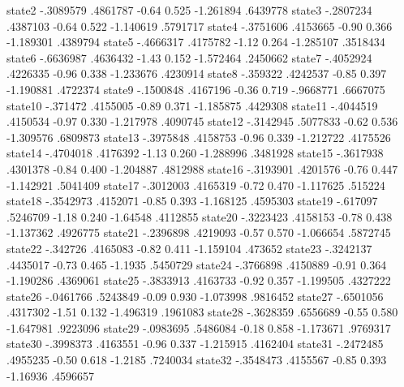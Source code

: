       state2 {\VBAR}  -.3089579   .4861787    -0.64   0.525    -1.261894    .6439778
      state3 {\VBAR}  -.2807234   .4387103    -0.64   0.522    -1.140619    .5791717
      state4 {\VBAR}  -.3751606   .4153665    -0.90   0.366    -1.189301    .4389794
      state5 {\VBAR}  -.4666317   .4175782    -1.12   0.264    -1.285107    .3518434
      state6 {\VBAR}  -.6636987   .4636432    -1.43   0.152    -1.572464    .2450662
      state7 {\VBAR}  -.4052924   .4226335    -0.96   0.338    -1.233676    .4230914
      state8 {\VBAR}   -.359322   .4242537    -0.85   0.397    -1.190881    .4722374
      state9 {\VBAR}  -.1500848   .4167196    -0.36   0.719    -.9668771    .6667075
     state10 {\VBAR}   -.371472   .4155005    -0.89   0.371    -1.185875    .4429308
     state11 {\VBAR}  -.4044519   .4150534    -0.97   0.330    -1.217978    .4090745
     state12 {\VBAR}  -.3142945   .5077833    -0.62   0.536    -1.309576    .6809873
     state13 {\VBAR}  -.3975848   .4158753    -0.96   0.339    -1.212722    .4175526
     state14 {\VBAR}  -.4704018   .4176392    -1.13   0.260    -1.288996    .3481928
     state15 {\VBAR}  -.3617938   .4301378    -0.84   0.400    -1.204887    .4812988
     state16 {\VBAR}  -.3193901   .4201576    -0.76   0.447    -1.142921    .5041409
     state17 {\VBAR}  -.3012003   .4165319    -0.72   0.470    -1.117625     .515224
     state18 {\VBAR}  -.3542973   .4152071    -0.85   0.393    -1.168125    .4595303
     state19 {\VBAR}   -.617097   .5246709    -1.18   0.240     -1.64548    .4112855
     state20 {\VBAR}  -.3223423   .4158153    -0.78   0.438    -1.137362    .4926775
     state21 {\VBAR}  -.2396898   .4219093    -0.57   0.570    -1.066654    .5872745
     state22 {\VBAR}   -.342726   .4165083    -0.82   0.411    -1.159104     .473652
     state23 {\VBAR}  -.3242137   .4435017    -0.73   0.465      -1.1935    .5450729
     state24 {\VBAR}  -.3766898   .4150889    -0.91   0.364    -1.190286    .4369061
     state25 {\VBAR}  -.3833913   .4163733    -0.92   0.357    -1.199505    .4327222
     state26 {\VBAR}  -.0461766   .5243849    -0.09   0.930    -1.073998    .9816452
     state27 {\VBAR}  -.6501056   .4317302    -1.51   0.132    -1.496319    .1961083
     state28 {\VBAR}  -.3628359   .6556689    -0.55   0.580    -1.647981    .9223096
     state29 {\VBAR}  -.0983695   .5486084    -0.18   0.858    -1.173671    .9769317
     state30 {\VBAR}  -.3998373   .4163551    -0.96   0.337    -1.215915    .4162404
     state31 {\VBAR}  -.2472485   .4955235    -0.50   0.618      -1.2185    .7240034
     state32 {\VBAR}  -.3548473   .4155567    -0.85   0.393     -1.16936    .4596657
